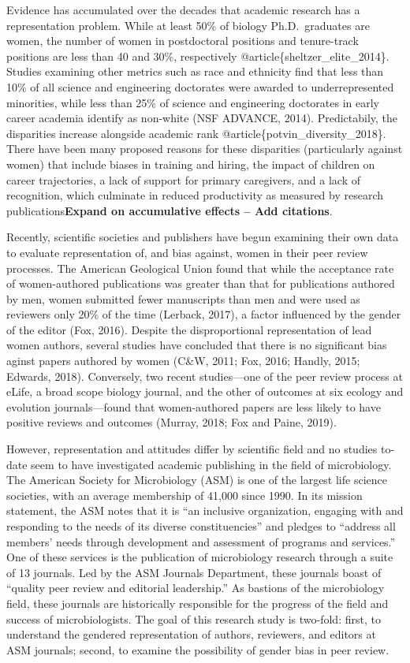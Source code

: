 \documentclass[11pt,]{article}
\begin{document}
Evidence has accumulated over the decades that academic research has a
representation problem. While at least 50\% of biology Ph.D.~graduates
are women, the number of women in postdoctoral positions and
tenure-track positions are less than 40 and 30\%, respectively
@article\{sheltzer\_elite\_2014\}. Studies examining other metrics such
as race and ethnicity find that less than 10\% of all science and
engineering doctorates were awarded to underrepresented minorities,
while less than 25\% of science and engineering doctorates in early
career academia identify as non-white (NSF ADVANCE, 2014). Predictabily,
the disparities increase alongside academic rank
@article\{potvin\_diversity\_2018\}. There have been many proposed
reasons for these disparities (particularly against women) that include
biases in training and hiring, the impact of children on career
trajectories, a lack of support for primary caregivers, and a lack of
recognition, which culminate in reduced productivity as measured by
research publications\textbf{Expand on accumulative effects -- Add
citations}.

Recently, scientific societies and publishers have begun examining their
own data to evaluate representation of, and bias against, women in their
peer review processes. The American Geological Union found that while
the acceptance rate of women-authored publications was greater than that
for publications authored by men, women submitted fewer manuscripts than
men and were used as reviewers only 20\% of the time (Lerback, 2017), a
factor influenced by the gender of the editor (Fox, 2016). Despite the
disproportional representation of lead women authors, several studies
have concluded that there is no significant bias aginst papers authored
by women (C\&W, 2011; Fox, 2016; Handly, 2015; Edwards, 2018).
Conversely, two recent studies---one of the peer review process at
eLife, a broad scope biology journal, and the other of outcomes at six
ecology and evolution journals---found that women-authored papers are
less likely to have positive reviews and outcomes (Murray, 2018; Fox and
Paine, 2019).

However, representation and attitudes differ by scientific field and no
studies to-date seem to have investigated academic publishing in the
field of microbiology. The American Society for Microbiology (ASM) is
one of the largest life science societies, with an average membership of
41,000 since 1990. In its mission statement, the ASM notes that it is
``an inclusive organization, engaging with and responding to the needs
of its diverse constituencies'' and pledges to ``address all members'
needs through development and assessment of programs and services.'' One
of these services is the publication of microbiology research through a
suite of 13 journals. Led by the ASM Journals Department, these journals
boast of ``quality peer review and editorial leadership.'' As bastions
of the microbiology field, these journals are historically responsible
for the progress of the field and success of microbiologists. The goal
of this research study is two-fold: first, to understand the gendered
representation of authors, reviewers, and editors at ASM journals;
second, to examine the possibility of gender bias in peer review.
\end{document}
